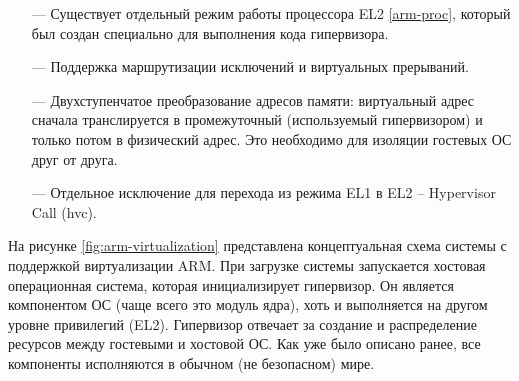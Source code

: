 \begin{itemize}
	\item [---] Существует отдельный режим работы процессора EL2 \ref{arm-proc}, который был создан специально для выполнения кода гипервизора.
	\item [---] Поддержка маршрутизации исключений и виртуальных прерываний.
	\item [---] Двухступенчатое преобразование адресов памяти: виртуальный адрес сначала транслируется в промежуточный (используемый гипервизором) и только потом в физический адрес. Это необходимо для изоляции гостевых ОС друг от друга.
	\item [---] Отдельное исключение для перехода из режима EL1 в EL2 -- Hypervisor Call (hvc).
\end{itemize}

На рисунке \ref{fig:arm-virtualization} представлена концептуальная схема системы с поддержкой виртуализации ARM. При загрузке системы запускается хостовая операционная система, которая инициализирует гипервизор. Он является компонентом ОС (чаще всего это модуль ядра), хоть и выполняется на другом уровне привилегий (EL2). Гипервизор отвечает за создание и распределение ресурсов между гостевыми и хостовой ОС. Как уже было описано ранее, все компоненты исполняются в обычном (не безопасном) мире.

